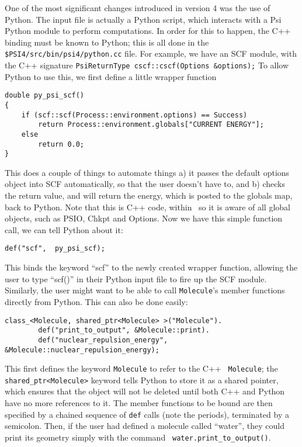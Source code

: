 One of the most significant changes introduced in version 4 was the use of
Python.  The input file is actually a Python script, which interacts with a Psi
Python module to perform computations.  In order for this to happen, the C++
binding must be known to Python; this is all done in the 
{\tt \$PSI4/src/bin/psi4/python.cc} file.  For example, we have an SCF module, with
the C++ signature
{\tt PsiReturnType cscf::cscf(Options \&options);}
To allow Python to use this, we first define a little wrapper function
\begin{verbatim}
double py_psi_scf()
{
    if (scf::scf(Process::environment.options) == Success)
        return Process::environment.globals["CURRENT ENERGY"];
    else
        return 0.0;
}
\end{verbatim}
This does a couple of things to automate things a) it passes the default
options object into SCF automatically, so that the user doesn't have to, and b)
checks the return value, and will return the energy, which is posted to the
globals map, back to Python.  Note that this is C++ code, within \PSIfour\ so
it is aware of all global objects, such as PSIO, Chkpt and Options.  Now we
have this simple function call, we can tell Python about it:
\begin{verbatim}
def("scf",  py_psi_scf);
\end{verbatim}
This binds the keyword ``scf'' to the newly created wrapper function, allowing
the user to type ``scf()'' in their Python input file to fire up the SCF
module.  Similarly, the user might want to be able to call {\tt Molecule}'s
member functions directly from Python.  This can also be done easily:

\begin{verbatim}
class_<Molecule, shared_ptr<Molecule> >("Molecule").
        def("print_to_output", &Molecule::print).
        def("nuclear_repulsion_energy", &Molecule::nuclear_repulsion_energy);
\end{verbatim}

This first defines the keyword {\tt Molecule} to refer to the C++ {\tt
Molecule}; the {\tt shared\_ptr<Molecule>} keyword tells Python to store it as
a shared pointer, which ensures that the object will not be deleted until both
C++ and Python have no more references to it.  The member functions to be bound
are then specified by a chained sequence of {\tt def} calls (note the periods),
terminated by a semicolon.  Then, if the user had defined a molecule called
``water'', they could print its geometry simply with the command {\tt
water.print\_to\_output()}.

